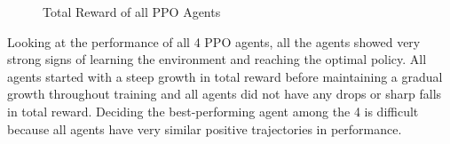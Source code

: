 \begin{figure}[H]
    \centering
    \caption{Total Reward of all PPO Agents}
    \label{fig:PPO_total_reward}
\end{figure}

Looking at the performance of all 4 PPO agents, all the agents showed very strong signs of learning the environment and reaching the optimal policy. All agents started with a steep growth in total reward before maintaining a gradual growth throughout training and all agents did not have any drops or sharp falls in total reward. Deciding the best-performing agent among the 4 is difficult because all agents have very similar positive trajectories in performance. 

